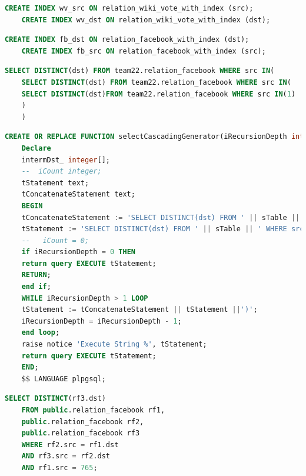 \begin{lstlisting}[language=SQL,caption=Erstellen von Indexen auf relation Tabelle wikivote,frame=single, label={2.indexwikivote.listing}]
    CREATE INDEX wv_src ON relation_wiki_vote_with_index (src);
    CREATE INDEX wv_dst ON relation_wiki_vote_with_index (dst);
\end{lstlisting}

\begin{lstlisting}[language=SQL,caption=Erstellen der Indexe für die relation Tabelle facebook,frame=single, label={2.indexfacebook.listing}]
    CREATE INDEX fb_dst ON relation_facebook_with_index (dst);
    CREATE INDEX fb_src ON relation_facebook_with_index (src);
\end{lstlisting}

\begin{lstlisting}[language=SQL,caption = Verschachteltes SELECT Statement,frame=single,label={2.SELECT.listing} ]
    SELECT DISTINCT(dst) FROM team22.relation_facebook WHERE src IN(
    SELECT DISTINCT(dst) FROM team22.relation_facebook WHERE src IN(
    SELECT DISTINCT(dst)FROM team22.relation_facebook WHERE src IN(1)
    )
    )
\end{lstlisting}

\begin{lstlisting}[language=SQL,caption = SELECT SourceCodeGenerator ,frame=single, label={2.SelectSourceCodeGenerator.listing} ]
    CREATE OR REPLACE FUNCTION selectCascadingGenerator(iRecursionDepth integer, sTable text, startingNode integer ) RETURNS SETOF integer AS $$
    Declare
    intermDst_ integer[];
    --  iCount integer;
    tStatement text;
    tConcatenateStatement text;
    BEGIN
    tConcatenateStatement := 'SELECT DISTINCT(dst) FROM ' || sTable || ' WHERE src IN(';
    tStatement := 'SELECT DISTINCT(dst) FROM ' || sTable || ' WHERE src IN('||startingNode||')';
    --   iCount = 0;
    if iRecursionDepth = 0 THEN
    return query EXECUTE tStatement;
    RETURN;
    end if;
    WHILE iRecursionDepth > 1 LOOP
    tStatement := tConcatenateStatement || tStatement ||')';
    iRecursionDepth = iRecursionDepth - 1;
    end loop;
    raise notice 'Execute String %', tStatement;
    return query EXECUTE tStatement;
    END;
    $$ LANGUAGE plpgsql;
\end{lstlisting}

\begin{lstlisting}[language=SQL,caption = Rekursiver JOIN,frame=single, label={2.JOIN.listing} ]
    SELECT DISTINCT(rf3.dst)
    FROM public.relation_facebook rf1,
    public.relation_facebook rf2,
    public.relation_facebook rf3
    WHERE rf2.src = rf1.dst
    AND rf3.src = rf2.dst
    AND rf1.src = 765;
\end{lstlisting}

